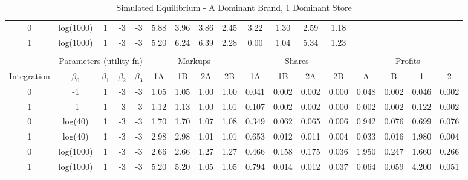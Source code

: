 \documentclass[12pt]{article}%
\begin{document}
\begin{table}[htbp]
{\begin{tabular}{c|cccc|cccc|cccc|cccc}
    0     & log(1000) & 1     & -3    & -3    & 5.88  & 3.96  & 3.86  & \multicolumn{1}{c}{2.45} & 3.22  & 1.30  & 2.59  & \multicolumn{1}{c}{1.18} &       &       &       &  \\
    1     & log(1000) & 1     & -3    & -3    & 5.20  & 6.24  & 6.39  & \multicolumn{1}{c}{2.28} & 0.00  & 1.04  & 5.34  & \multicolumn{1}{c}{1.23} &       &       &       &  \\
    \multicolumn{1}{c}{} &       &       &       & \multicolumn{1}{c}{} &       &       &       & \multicolumn{1}{c}{} &       &       &       & \multicolumn{1}{c}{} &       &       &       &  \\
          & \multicolumn{4}{c|}{Parameters (utility fn)} & \multicolumn{4}{c|}{Markups}  & \multicolumn{4}{c|}{Shares}   & \multicolumn{4}{c}{Profits} \\
    \midrule
    \multicolumn{1}{c|}{Integration} & \multicolumn{1}{c}{$\beta_0$} & \multicolumn{1}{c}{$\beta_1$} & \multicolumn{1}{c}{$\beta_2$} & \multicolumn{1}{c|}{$\beta_3$} & \multicolumn{1}{c}{1A} & \multicolumn{1}{c}{1B} & \multicolumn{1}{c}{2A} & \multicolumn{1}{c|}{2B} & \multicolumn{1}{c}{1A} & \multicolumn{1}{c}{1B} & \multicolumn{1}{c}{2A} & \multicolumn{1}{c|}{2B} & \multicolumn{1}{c}{A} & \multicolumn{1}{c}{B} & \multicolumn{1}{c}{1} & \multicolumn{1}{c}{2} \\
    \midrule
    \midrule
    0     & -1    & 1     & -3    & -3    & 1.05  & 1.05  & 1.00  & 1.00  & 0.041 & 0.002 & 0.002 & 0.000 & 0.048 & 0.002 & 0.046 & 0.002 \\
    1     & -1    & 1     & -3    & -3    & 1.12  & 1.13  & 1.00  & 1.01  & 0.107 & 0.002 & 0.002 & 0.000 & 0.002 & 0.002 & 0.122 & 0.002 \\
   
    0     & log(40) & 1     & -3    & -3    & 1.70  & 1.70  & 1.07  & 1.08  & 0.349 & 0.062 & 0.065 & 0.006 & 0.942 & 0.076 & 0.699 & 0.076 \\
    1     & log(40) & 1     & -3    & -3    & 2.98  & 2.98  & 1.01  & 1.01  & 0.653 & 0.012 & 0.011 & 0.004 & 0.033 & 0.016 & 1.980 & 0.004 \\
   
    0     & log(1000) & 1     & -3    & -3    & 2.66  & 2.66  & 1.27  & 1.27  & 0.466 & 0.158 & 0.175 & 0.036 & 1.950 & 0.247 & 1.660 & 0.266 \\
    1     & log(1000) & 1     & -3    & -3    & 5.20  & 5.20  & 1.05  & 1.05  & 0.794 & 0.014 & 0.012 & 0.037 & 0.064 & 0.059 & 4.200 & 0.051 \\
    \end{tabular}%
    }
    \caption{Simulated Equilibrium - A Dominant Brand, 1 Dominant Store}
  \label{tab:store effects - A, 1 dom}%
\end{table}%
\end{document}

